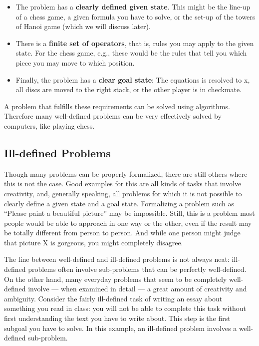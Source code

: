 \documentclass[
]{krantz}
\begin{document}
\begin{itemize}
\item
  The problem has a \textbf{clearly defined given state}. This might be the line-up of a chess game, a given formula you have to solve, or the set-up of the towers of Hanoi game (which we will discuss later).
\item
  There is a \textbf{finite set of operators}, that is, rules you may apply to the given state. For the chess game, e.g., these would be the rules that tell you which piece you may move to which position.
\item
  Finally, the problem has a \textbf{clear goal state}: The equations is resolved to x, all discs are moved to the right stack, or the other player is in checkmate.
\end{itemize}

A problem that fulfills these requirements can be solved using algorithms. Therefore many well-defined problems can be very effectively solved by computers, like playing chess.

\subsection*{Ill-defined Problems}\label{ill-defined-problems}


Though many problems can be properly formalized, there are still others where this is not the case. Good examples for this are all kinds of tasks that involve creativity, and, generally speaking, all problems for which it is not possible to clearly define a given state and a goal state. Formalizing a problem such as ``Please paint a beautiful picture'' may be impossible. Still, this is a problem most people would be able to approach in one way or the other, even if the result may be totally different from person to person. And while one person might judge that picture X is gorgeous, you might completely disagree.

The line between well-defined and ill-defined problems is not always neat: ill-defined problems often involve sub-problems that can be perfectly well-defined. On the other hand, many everyday problems that seem to be completely well-defined involve --- when examined in detail --- a great amount of creativity and ambiguity. Consider the fairly ill-defined task of writing an essay about something you read in class: you will not be able to complete this task without first understanding the text you have to write about. This step is the first subgoal you have to solve. In this example, an ill-defined problem involves a well-defined sub-problem.
\end{document}
